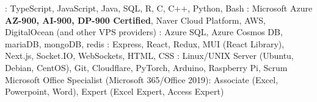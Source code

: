 

\begin{cvparagraph}
  \raggedright
  : TypeScript, JavaScript, Java, SQL, R, C, C++, Python, Bash
  \linebreak
  : Microsoft Azure \textbf{AZ-900, AI-900, DP-900 Certified}, Naver Cloud Platform, AWS, DigitalOcean (and other VPS providers)
  \linebreak
  : Azure SQL, Azure Cosmos DB, mariaDB, mongoDB, redis
  \linebreak
  : Express, React, Redux, MUI (React Library), Next.js, Socket.IO, WebSockets, HTML, CSS
  \linebreak
  : Linux/UNIX Server (Ubuntu, Debian, CentOS), Git, Cloudflare, PyTorch, Arduino, Raspberry Pi, Scrum \\
  Microsoft Office Specialist (Microsoft 365/Office 2019): Associate (Excel, Powerpoint, Word), Expert (Excel Expert, Access Expert)
\end{cvparagraph}